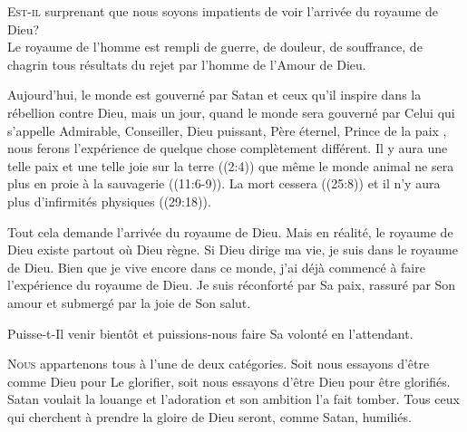 \lettrine{E}{st-il} surprenant que nous soyons impatients
 de voir l'arrivée du royaume de Dieu? \\[1ex]
Le royaume de l'homme est rempli de guerre, de douleur, de souffrance,
 de chagrin \ocadr tous résultats du rejet par l'homme de l'Amour de Dieu. 


Aujourd'hui, le monde est gouverné par Satan et ceux qu'il inspire
 dans la rébellion contre Dieu, mais un jour, quand le monde sera gouverné
 par Celui qui s'appelle \Og Admirable, Conseiller, Dieu puissant,
 Père éternel, Prince de la paix \Fg{}, 
 nous ferons l'expérience de quelque chose complètement différent.
 Il y aura une telle paix et une telle joie sur la terre ((2:4))
 que même le monde animal ne sera plus en proie à la sauvagerie
 ((11:6-9)).
 La mort cessera ((25:8))
 et il n'y aura plus d'infirmités physiques ((29:18)). 

Tout cela demande l'arrivée du royaume de Dieu.
 Mais en réalité, le royaume de Dieu existe partout où Dieu règne.
 Si Dieu dirige ma vie, je suis dans le royaume de Dieu.
 Bien que je vive encore dans ce monde, j'ai déjà commencé à faire
 l'expérience du royaume de Dieu. Je suis réconforté par Sa paix,
 rassuré par Son amour et submergé par la joie de Son salut. 

Puisse-t-Il venir bientôt
 \ocadr et puissions-nous faire Sa volonté en l'attendant. 

\dvrule






\lettrine{N}{ous} appartenons tous à l'une de deux catégories.
 Soit nous essayons d'être comme Dieu pour Le glorifier,
 soit nous essayons d'être Dieu pour être glorifiés.
 Satan voulait la louange et l'adoration
 \ocadr et son ambition l'a fait tomber.
 Tous ceux qui cherchent à prendre la gloire de Dieu seront,
 comme Satan, humiliés. 


